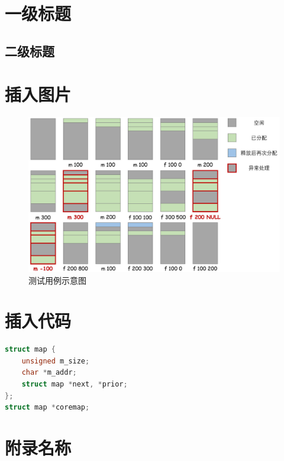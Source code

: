 \documentclass[a4paper,utf8]{ctexart}
\begin{document}
\maketitle

\section{一级标题}
\subsection{二级标题}

\section{插入图片}
\begin{figure}[H]
    \centering
    \includegraphics[width=\textwidth]{./img/example.jpg}
    \caption{测试用例示意图}
    \label{fig:example}
\end{figure}

\section{插入代码}
\begin{lstlisting}[language=C]
struct map {
    unsigned m_size;
    char *m_addr;
    struct map *next, *prior;
};
struct map *coremap;
\end{lstlisting}

% 

\appendix

\section{附录名称}
\end{document}
